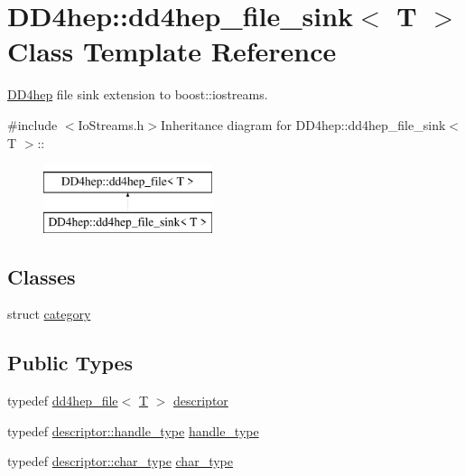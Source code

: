 \hypertarget{class_d_d4hep_1_1dd4hep__file__sink}{
\section{DD4hep::dd4hep\_\-file\_\-sink$<$ T $>$ Class Template Reference}
\label{class_d_d4hep_1_1dd4hep__file__sink}
}


\hyperlink{namespace_d_d4hep}{DD4hep} file sink extension to boost::iostreams.  


{\ttfamily \#include $<$IoStreams.h$>$}Inheritance diagram for DD4hep::dd4hep\_\-file\_\-sink$<$ T $>$::\begin{figure}[H]
\begin{center}
\leavevmode
\includegraphics[height=2cm]{class_d_d4hep_1_1dd4hep__file__sink}
\end{center}
\end{figure}
\subsection*{Classes}
\begin{DoxyCompactItemize}
\item 
struct \hyperlink{struct_d_d4hep_1_1dd4hep__file__sink_1_1category}{category}
\end{DoxyCompactItemize}
\subsection*{Public Types}
\begin{DoxyCompactItemize}
\item 
typedef \hyperlink{class_d_d4hep_1_1dd4hep__file}{dd4hep\_\-file}$<$ \hyperlink{class_t}{T} $>$ \hyperlink{class_d_d4hep_1_1dd4hep__file__sink_adf4c7b626a18fe2fdaf8a8fb6bf5ea3b}{descriptor}
\item 
typedef \hyperlink{class_t}{descriptor::handle\_\-type} \hyperlink{class_d_d4hep_1_1dd4hep__file__sink_a660f6328d32832c96f2b59afb2164214}{handle\_\-type}
\item 
typedef \hyperlink{class_d_d4hep_1_1dd4hep__file_aef4242f7f2fe15a59f7bf7a8f6ba24d5}{descriptor::char\_\-type} \hyperlink{class_d_d4hep_1_1dd4hep__file__sink_a358c907508083da65c4cd31725331460}{char\_\-type}
\end{DoxyCompactItemize}

